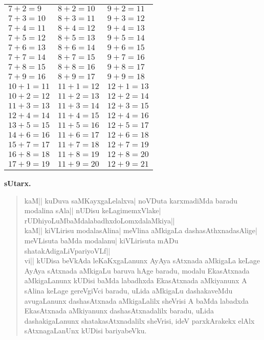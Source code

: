 {\begin{center}
\begin{tabular}{|l|l|l|}
$7 + 2 = 9 $ & $ 8 + 2 = 10 $ & $ 9 + 2 = 11 $\\
$7 + 3 = 10 $ & $ 8 + 3 = 11 $ & $ 9 + 3 = 12 $\\
$7 + 4 = 11 $ & $ 8 + 4 = 12 $ & $ 9 + 4 = 13 $\\
$7 + 5 = 12 $ & $ 8 + 5 = 13 $ & $ 9 + 5 = 14 $\\
$7 + 6 = 13 $ & $ 8 + 6 = 14 $ & $ 9 + 6 = 15 $\\
$7 + 7 = 14 $ & $ 8 + 7 = 15 $ & $ 9 + 7 = 16 $\\
$7 + 8 = 15 $ & $ 8 + 8 = 16 $ & $ 9 + 8 = 17 $\\
$7 + 9 = 16 $ & $ 8 + 9 = 17 $ & $ 9 + 9 = 18 $\\
\hline
$10 + 1 = 11 $ & $ 11 + 1 = 12 $ & $ 12 + 1 =  13$\\
$10 + 2 = 12 $ & $ 11 + 2 = 13 $ & $ 12 + 2 = 14 $\\
$11 + 3 = 13 $ & $ 11 + 3 = 14 $ & $ 12 + 3 = 15 $\\
$12 + 4 = 14 $ & $ 11 + 4 = 15 $ & $ 12 + 4 = 16 $\\
$13 + 5 = 15 $ & $ 11 + 5 = 16 $ & $ 12 + 5 = 17 $\\
$14 + 6 = 16 $ & $ 11 + 6 = 17 $ & $ 12 + 6 = 18 $\\
$15 + 7 = 17 $ & $ 11 + 7 = 18 $ & $ 12 + 7 = 19 $\\
$16 + 8 = 18 $ & $ 11 + 8 = 19 $ & $ 12 + 8 = 20 $\\
$17 + 9 = 19 $ & $ 11 + 9 = 20 $ & $ 12 + 9 = 21 $\\
\hline
\end{tabular}
\end{center}
}

\begin{center}
{\large\bf sUtarx.}
\end{center}

\begin{verse}
kaM|| kuDuva saMKayxgaLelalxva| noVDuta karxmadiMda baradu modalina sAla|| nUDisu keLagimemxVlake| rUDhiyoLuMbaMdalabadhxdoLomxdalaMkiya||\\

kaM|| kiVLirisu modalasAlina| meVlina aMkigaLa dashasAthxnadasAlige| meVLisuta baMda modalanu| kiVLirisuta mADu shatakAdigaLiVpariyoVLf||\\

vi|| kUDisa beVkAda leKaKxgaLanunx AyAya sAtxnada aMkigaLa keLage AyAya sAtxnada aMkigaLu baruva hAge baradu, modalu EkasAtxnada aMkigaLanunx kUDisi baMda labadhxda EkasAtxnada aMki\-yanunx A sAlina keLage gereVgiVci baradu, uLida aMkigaLu dashakaveMdu avugaLanunx dashasAtxnada aMkigaLalilx sheVrisi A baMda labadxda EkasAtxnada aMkiyanunx dashasAtxnadalilx baradu, uLida dashakigaLanunx shatakasAtxnadalilx sheVrisi, ideV parxkArakekx elAlx sAtxnagaLanUnx kUDisi bariyabeVku.\\
\end{verse}

